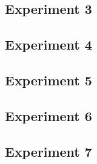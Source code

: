 \subsection{Experiment 3}
\subsection{Experiment 4}
\subsection{Experiment 5}
\subsection{Experiment 6}
\subsection{Experiment 7}
\cleardoublepage